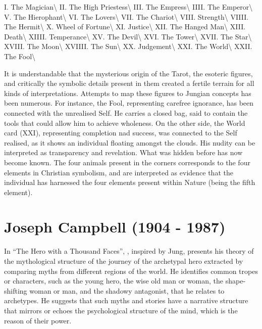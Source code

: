\documentclass[]{book}
\begin{document}
I. The Magician\textbackslash{}
II. The High Priestess\textbackslash{}
III. The Empress\textbackslash{}
IIII. The Emperor\textbackslash{}
V. The Hierophant\textbackslash{}
VI. The Lovers\textbackslash{}
VII. The Chariot\textbackslash{}
VIII. Strength\textbackslash{}
VIIII. The Hermit\textbackslash{}
X. Wheel of Fortune\textbackslash{}
XI. Justice\textbackslash{}
XII. The Hanged Man\textbackslash{}
XIII. Death\textbackslash{}
XIIII. Temperance\textbackslash{}
XV. The Devil\textbackslash{}
XVI. The Tower\textbackslash{}
XVII. The Star\textbackslash{}
XVIII. The Moon\textbackslash{}
XVIIII. The Sun\textbackslash{}
XX. Judgement\textbackslash{}
XXI. The World\textbackslash{}
XXII. The Fool\textbackslash{}

It is understandable that the mysterious origin of the Tarot, the esoteric figures, and critically the symbolic details present in them created a fertile terrain for all kinds of interpretations. Attempts to map these figures to Jungian concepts has been numerous. For instance, the Fool, representing carefree ignorance, has been connected with the unrealised Self. He carries a closed bag, said to contain the tools that could allow him to achieve wholeness. On the other side, the World card (XXI), representing completion nad success, was connected to the Self realised, as it shows an individual floating amongst the clouds. His nudity can be interpreted as transparency and revelation. What was hidden before has now become known. The four animals present in the corners corresponds to the four elements in Christian symbolism, and are interpreted as evidence that the individual has harnessed the four elements present within Nature (being the fifth element).

\hypertarget{joseph-campbell-1904---1987}{%
\section{Joseph Campbell (1904 - 1987)}\label{joseph-campbell-1904---1987}}

In ``The Hero with a Thousand Faces'', \citet{campbell1949hero}, inspired by Jung, presents his theory of the mythological structure of the journey of the archetypal hero extracted by comparing myths from different regions of the world. He identifies common tropes or characters, such as the young hero, the wise old man or woman, the shape-shifting woman or man, and the shadowy antagonist, that he relates to archetypes. He suggests that such myths and stories have a narrative structure that mirrors or echoes the psychological structure of the mind, which is the reason of their power.
\end{document}
